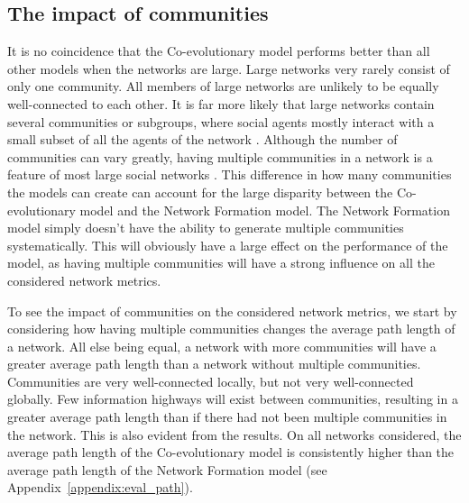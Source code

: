 \documentclass[11pt]{article}
\begin{document}
\subsection{The impact of communities}
It is no coincidence that the Co-evolutionary model performs better than all other models when the networks are large. Large networks very rarely consist of only one community. All members of large networks are unlikely to be equally well-connected to each other. It is far more likely that large networks contain several communities or subgroups, where social agents mostly interact with a small subset of all the agents of the network \cite{backstrom2006group}. Although the number of communities can vary greatly, having multiple communities in a network is a feature of most large social networks \cite{backstrom2006group, yang2011detecting}.
This difference in how many communities the models can create can account for the large disparity between the Co-evolutionary model and the Network Formation model. The Network Formation model simply doesn't have the ability to generate multiple communities systematically. This will obviously have a large effect on the performance of the model, as having multiple communities will have a strong influence on all the considered network metrics. 

To see the impact of communities on the considered network metrics, we start by considering how having multiple communities changes the average path length of a network. All else being equal, a network with more communities will have a greater average path length than a network without multiple communities. Communities are very well-connected locally, but not very well-connected globally. Few information highways will exist between communities, resulting in a greater average path length than if there had not been multiple communities in the network. This is also evident from the results. On all networks considered, the average path length of the Co-evolutionary model is consistently higher than the average path length of the Network Formation model (see Appendix~\ref{appendix:eval_path}).
\end{document}
